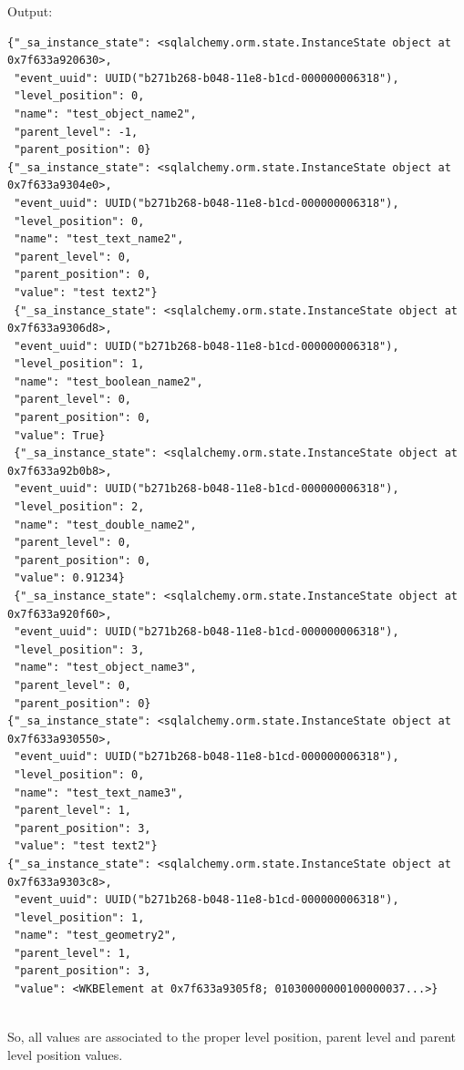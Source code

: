 Output:

\begin{lstlisting}[style=python, caption={JSON output after query the eboa for the specific event previously shown.}]
{"_sa_instance_state": <sqlalchemy.orm.state.InstanceState object at 0x7f633a920630>,
 "event_uuid": UUID("b271b268-b048-11e8-b1cd-000000006318"),
 "level_position": 0,
 "name": "test_object_name2",
 "parent_level": -1,
 "parent_position": 0}
{"_sa_instance_state": <sqlalchemy.orm.state.InstanceState object at 0x7f633a9304e0>,
 "event_uuid": UUID("b271b268-b048-11e8-b1cd-000000006318"),
 "level_position": 0,
 "name": "test_text_name2",
 "parent_level": 0,
 "parent_position": 0,
 "value": "test text2"}
 {"_sa_instance_state": <sqlalchemy.orm.state.InstanceState object at 0x7f633a9306d8>,
 "event_uuid": UUID("b271b268-b048-11e8-b1cd-000000006318"),
 "level_position": 1,
 "name": "test_boolean_name2",
 "parent_level": 0,
 "parent_position": 0,
 "value": True}
 {"_sa_instance_state": <sqlalchemy.orm.state.InstanceState object at 0x7f633a92b0b8>,
 "event_uuid": UUID("b271b268-b048-11e8-b1cd-000000006318"),
 "level_position": 2,
 "name": "test_double_name2",
 "parent_level": 0,
 "parent_position": 0,
 "value": 0.91234}
 {"_sa_instance_state": <sqlalchemy.orm.state.InstanceState object at 0x7f633a920f60>,
 "event_uuid": UUID("b271b268-b048-11e8-b1cd-000000006318"),
 "level_position": 3,
 "name": "test_object_name3",
 "parent_level": 0,
 "parent_position": 0}
{"_sa_instance_state": <sqlalchemy.orm.state.InstanceState object at 0x7f633a930550>,
 "event_uuid": UUID("b271b268-b048-11e8-b1cd-000000006318"),
 "level_position": 0,
 "name": "test_text_name3",
 "parent_level": 1,
 "parent_position": 3,
 "value": "test text2"}
{"_sa_instance_state": <sqlalchemy.orm.state.InstanceState object at 0x7f633a9303c8>,
 "event_uuid": UUID("b271b268-b048-11e8-b1cd-000000006318"),
 "level_position": 1,
 "name": "test_geometry2",
 "parent_level": 1,
 "parent_position": 3,
 "value": <WKBElement at 0x7f633a9305f8; 01030000000100000037...>}
 
\end{lstlisting}

So, all values are associated to the proper level position, parent level and parent level position values.
